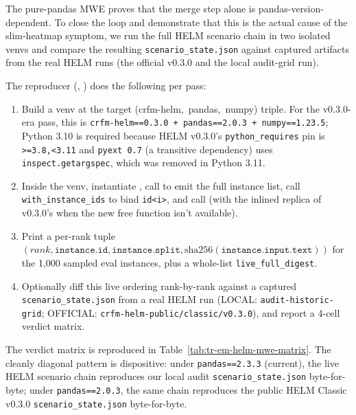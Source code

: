 \documentclass[11pt]{article}
\begin{document}
The pure-pandas MWE proves that the merge step alone is
  pandas-version-dependent.
To close the loop and demonstrate that this is the actual cause of
  the slim-heatmap symptom, we run the full HELM scenario chain in two
  isolated venvs and compare the resulting
  \texttt{scenario\_state.json} against captured artifacts from the
  real HELM runs (the official v0.3.0 and the local audit-grid run).

The reproducer (,
  ) does the following per
  pass:

\begin{enumerate}
  \item Build a venv at the target \mbox{(crfm-helm, pandas, numpy)}
        triple.
        For the v0.3.0-era pass, this is
        \texttt{crfm-helm==0.3.0 + pandas==2.0.3 + numpy==1.23.5};
        Python 3.10 is required because HELM v0.3.0's
        \texttt{python\_requires} pin is \texttt{>=3.8,<3.11} and
        \texttt{pyext 0.7} (a transitive dependency) uses
        \texttt{inspect.getargspec}, which was removed in Python 3.11.
  \item Inside the venv, instantiate
        , call
         to
        emit the full instance list, call \texttt{with\_instance\_ids}
        to bind \texttt{id<i>}, and call
         (with the inlined replica of v0.3.0's
         when the new free
        function isn't available).
  \item Print a per-rank tuple
        $(rank, \texttt{instance.id}, \texttt{instance.split},
        \mathrm{sha256}(\texttt{instance.input.text}))$
        for the 1{,}000 sampled eval instances, plus a
        whole-list \texttt{live\_full\_digest}.
  \item Optionally diff this live ordering rank-by-rank against a
        captured \texttt{scenario\_state.json} from a real HELM run
        (LOCAL: \texttt{audit-historic-grid};
         OFFICIAL: \texttt{crfm-helm-public/classic/v0.3.0}), and
        report a 4-cell verdict matrix.
\end{enumerate}

The verdict matrix is reproduced in
  Table~\ref{tab:tr-em-helm-mwe-matrix}.
The cleanly diagonal pattern is dispositive: under
  \texttt{pandas==2.3.3} (current), the live HELM scenario chain
  reproduces our local audit \texttt{scenario\_state.json}
  byte-for-byte; under \texttt{pandas==2.0.3}, the same chain
  reproduces the public HELM Classic v0.3.0
  \texttt{scenario\_state.json} byte-for-byte.
\end{document}
